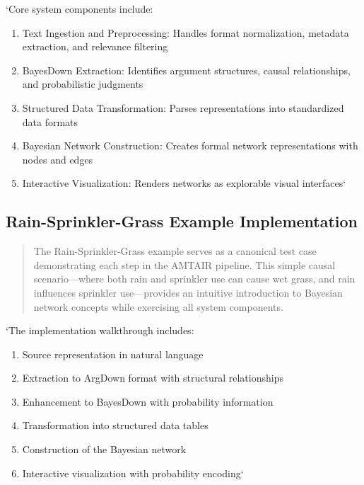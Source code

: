 \documentclass[]{book}
\providecommand{\tightlist}{%
  \setlength{\itemsep}{0pt}\setlength{\parskip}{0pt}}
\begin{document}
`Core system components include:

\begin{enumerate}
\def\labelenumi{\arabic{enumi}.}
\tightlist
\item
  Text Ingestion and Preprocessing: Handles format normalization,
  metadata extraction, and relevance filtering
\item
  BayesDown Extraction: Identifies argument structures, causal
  relationships, and probabilistic judgments
\item
  Structured Data Transformation: Parses representations into
  standardized data formats
\item
  Bayesian Network Construction: Creates formal network representations
  with nodes and edges
\item
  Interactive Visualization: Renders networks as explorable visual
  interfaces`
\end{enumerate}

\subsection{Rain-Sprinkler-Grass Example
Implementation}\label{rain-sprinkler-grass-example-implementation}

\begin{quote}
The Rain-Sprinkler-Grass example serves as a canonical test case
demonstrating each step in the AMTAIR pipeline. This simple causal
scenario---where both rain and sprinkler use can cause wet grass, and
rain influences sprinkler use---provides an intuitive introduction to
Bayesian network concepts while exercising all system components.
\end{quote}

`The implementation walkthrough includes:

\begin{enumerate}
\def\labelenumi{\arabic{enumi}.}
\tightlist
\item
  Source representation in natural language
\item
  Extraction to ArgDown format with structural relationships
\item
  Enhancement to BayesDown with probability information
\item
  Transformation into structured data tables
\item
  Construction of the Bayesian network
\item
  Interactive visualization with probability encoding`
\end{enumerate}
\end{document}
